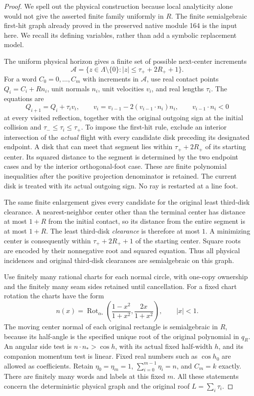 \begin{proof}
We spell out the physical construction because local analyticity
alone would not give the asserted finite family uniformly in $R$.
The finite semialgebraic first-hit graph already proved in the
preserved native module 164 is the input here. We recall its
defining variables, rather than add a symbolic replacement model.

The uniform physical horizon gives a finite set of possible
next-center increments
\[
 \mathcal A=\{z\in\Lambda\setminus\{0\}:
                         |z|\le\tau_++2R_++1\}.
\]
For a word $C_0=0,\ldots,C_m$ with increments in $\mathcal A$,
use real contact points $Q_i=C_i+Rn_i$, unit normals $n_i$,
unit velocities $v_i$, and real lengths $\tau_i$.
The equations are
\[
 Q_{i+1}=Q_i+\tau_i v_i,\qquad
 v_i=v_{i-1}-2(v_{i-1}\cdot n_i)n_i,\qquad
 v_{i-1}\cdot n_i<0
\]
at every visited reflection, together with the original outgoing
sign at the initial collision and
$\tau_-\le\tau_i\le\tau_+$. To impose the first-hit rule, exclude
an interior intersection of the \emph{actual} flight with every
candidate disk preceding its designated endpoint. A disk that can
meet that segment lies within $\tau_++2R_+$ of its starting
center. Its squared distance to the segment is determined by the
two endpoint cases and by the interior orthogonal-foot case.
These are finite polynomial inequalities after the positive
projection denominator is retained. The current disk is treated
with its actual outgoing sign. No ray is restarted at a line foot.

The same finite enlargement gives every candidate for the original
least third-disk clearance.  A nearest-neighbor center other than
the terminal center has distance at most $1+R$ from the initial
contact, so its distance from the entire segment is at most $1+R$.
The least third-disk \emph{clearance} is therefore at most $1$.
A minimizing center is consequently within $\tau_++2R_++1$
of the starting center.
Square roots are encoded by their nonnegative root and squared
equation. Thus all physical incidences and original third-disk
clearances are semialgebraic on this graph.

Use finitely many rational charts for each normal circle, with
one-copy ownership and the finitely many seam sides retained until
cancellation. For a fixed chart rotation the charts have the form
\[
 n(x)=\operatorname{Rot}_{\alpha_*}
       \left(\frac{1-x^2}{1+x^2},\frac{2x}{1+x^2}\right),
 \qquad |x|<1.
\]
The moving center normal of each original rectangle is
semialgebraic in $R$, because its half-angle is the specified unique
root of the original polynomial in $q_R$. An angular side test is
$n\cdot n_*>\cos h$, with its actual fixed half-width $h$,
and its companion momentum test is linear. Fixed real numbers
such as $\cos h_0$ are allowed as coefficients.
Retain $\eta_0=\eta_m=1$,
$\sum_{i=0}^{m-1}\eta_i=n$, and $C_m=k$ exactly.
There are finitely many words and labels at this fixed $m$.
All these statements concern the deterministic physical graph and
the original roof $L=\sum_i\tau_i$.


\end{proof}
